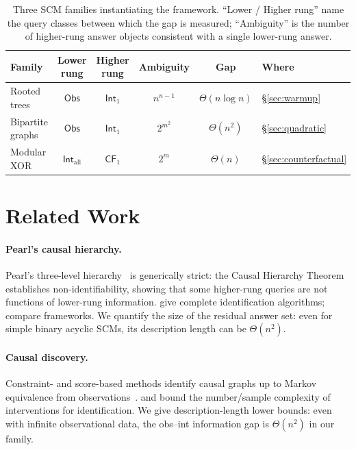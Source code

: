 \documentclass{article}
\theoremstyle{plain}
\theoremstyle{definition}
\newcommand{\Obs}{\mathsf{Obs}}
\newcommand{\Int}{\mathsf{Int}}
\newcommand{\CF}{\mathsf{CF}}
\begin{document}
\begin{table}[h]
\centering
\small
\begin{tabular}{@{}lccccl@{}}
\toprule
\textbf{Family} & \textbf{Lower rung} & \textbf{Higher rung} & \textbf{Ambiguity} & \textbf{Gap} & \textbf{Where} \\
\midrule
Rooted trees     & $\Obs$              & $\Int_1$            & $n^{n-1}$ & $\Theta(n \log n)$ & \S\ref{sec:warmup} \\
Bipartite graphs & $\Obs$              & $\Int_1$            & $2^{m^2}$ & $\Theta(n^2)$      & \S\ref{sec:quadratic} \\
Modular XOR      & $\Int_{\mathrm{all}}$ & $\CF_1$           & $2^m$     & $\Theta(n)$        & \S\ref{sec:counterfactual} \\
\bottomrule
\end{tabular}
\caption{Three SCM families instantiating the framework. ``Lower / Higher rung'' name the query classes between which the gap is measured; ``Ambiguity'' is the number of higher-rung answer objects consistent with a single lower-rung answer.}
\label{tab:summary}
\end{table}

\section{Related Work}
\label{sec:related}

\paragraph{Pearl's causal hierarchy.}
Pearl's three-level hierarchy~\citep{pearl2009causality,pearl2018book} is generically strict: the Causal Hierarchy Theorem~\citep{bareinboim2022pearl} establishes non-identifiability, showing that some higher-rung queries are not functions of lower-rung information. \citet{shpitser2008complete} give complete identification algorithms; \citet{ibeling2023comparing} compare frameworks. We quantify the size of the residual answer set: even for simple binary acyclic SCMs, its description length can be $\Theta(n^2)$.

\paragraph{Causal discovery.}
Constraint- and score-based methods identify causal graphs up to Markov equivalence from observations~\citep{spirtes2000causation,peters2017elements,hauser2012characterization}. \citet{eberhardt2005number} and \citet{shanmugam2015learning} bound the number/sample complexity of interventions for identification. We give description-length lower bounds: even with infinite observational data, the obs--int information gap is $\Theta(n^2)$ in our family.
\end{document}
